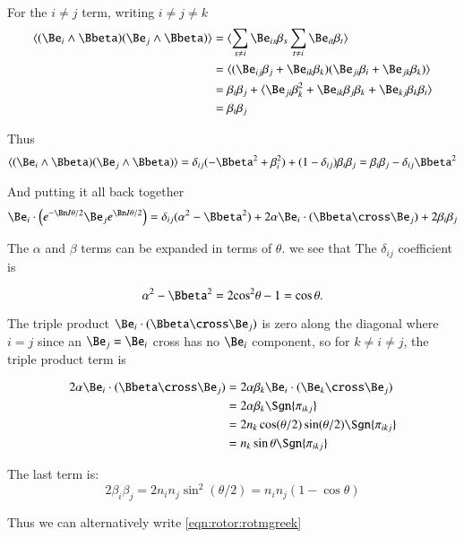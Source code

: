 For the $i \ne j$ term, writing $i \ne j \ne k$
\begin{align*}
\langle{(\Be_i \wedge \Bbeta) (\Be_j \wedge \Bbeta)}\rangle
&= \langle{\sum_{s \ne i} \Be_{is} \beta_s\sum_{t \ne i} \Be_{it} \beta_t}\rangle \\
&= \langle{( \Be_{ij} \beta_j + \Be_{ik} \beta_k) ( \Be_{ji} \beta_i + \Be_{jk} \beta_k)}\rangle \\
&= \beta_i\beta_j + \langle{ \Be_{ji} \beta_k^2 +\Be_{ik} \beta_j \beta_k +\Be_{kj} \beta_k \beta_i }\rangle \\
&= \beta_i\beta_j \\
\end{align*}

Thus
\[
\langle{ (\Be_i \wedge \Bbeta) ( \Be_j \wedge \Bbeta) } \rangle 
= \delta_{ij}(-\Bbeta^2 + \beta_i^2) + (1-\delta_{ij})\beta_i\beta_j
= \beta_i\beta_j -\delta_{ij}\Bbeta^2
\]

And putting it all back together
\begin{equation}\label{eqn:rotor:rotmgreek}
\Be_i \cdot \left(e^{-\Bn I \theta/2} \Be_j e^{\Bn I \theta/2}\right)
= \delta_{ij}(\alpha^2 -\Bbeta^2) + 2\alpha \Be_i \cdot (\Bbeta \cross \Be_j) + 2\beta_i\beta_j
\end{equation}


The $\alpha$ and $\beta$ terms can be expanded in terms of $\theta$.
we see that The $\delta_{ij}$ coefficient is

\[
\alpha^2 -\Bbeta^2 = 2{\cos}^2{\theta} -1 = \cos\theta.
\]

The triple product $\Be_i \cdot (\Bbeta \cross \Be_j)$ is zero along the diagonal where $i=j$ since an $\Be_j=\Be_i$ cross has no $\Be_i$ component, so
for $k \ne i \ne j$, the triple product term is

\begin{align*}
2\alpha \Be_i \cdot (\Bbeta \cross \Be_j)
&= 2\alpha \beta_k \Be_i \cdot (\Be_k \cross \Be_j) \\
&= 2\alpha \beta_k \Sgn{\pi_{ikj}} \\
&= 2 n_k \cos({\theta/2})\sin({\theta/2}) \Sgn{\pi_{ikj}} \\
&= n_k \sin{\theta} \Sgn{\pi_{ikj}} \\
\end{align*}

The last term is:
\[
2\beta_i\beta_j
= 2 n_i n_j {\sin}^2({\theta/2})
= n_i n_j (1-\cos\theta) 
\]

Thus we can alternatively write \ref{eqn:rotor:rotmgreek}


